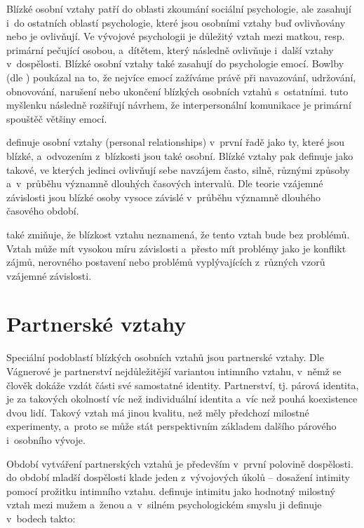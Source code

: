 \documentclass[a4paper, 12pt, notitlepage, oneside, numbers=noenddot]{report}
\begin{document}
Blízké osobní vztahy patří do oblasti zkoumání sociální psychologie,
ale zasahují i~do ostatních oblastí psychologie, které jsou osobními
vztahy buď ovlivňovány nebo je ovlivňují.  Ve vývojové psychologii je
důležitý vztah mezi matkou, resp. primární pečující osobou, a~dítětem,
který následně ovlivňuje i~další vztahy v~dospělosti.  Blízké osobní
vztahy také zasahují do psychologie emocí.  Bowlby (dle
\citealp{GuerreroAndersen2000}) poukázal na to, že nejvíce emocí
zažíváme právě při navazování, udržování, obnovování, narušení nebo
ukončení blízkých osobních vztahů s~ostatními.
\citet{GuerreroAndersen2000} tuto myšlenku následně rozšiřují návrhem,
že interpersonální komunikace je primární spouštěč většiny emocí.

\citet{Kelley1986} definuje osobní vztahy (personal relationships)
v~první řadě jako ty, které jsou blízké, a~odvozením z~blízkosti jsou
také osobní.  Blízké vztahy pak definuje jako takové, ve kterých
jedinci ovlivňují sebe navzájem často, silně, různými způsoby
a~v~průběhu významně dlouhých časových intervalů.  Dle teorie vzájemné
závislosti jsou blízké osoby vysoce závislé v~průběhu významně
dlouhého časového období.

\citeauthor{Kelley1986} také zmiňuje, že blízkost vztahu neznamená, že
tento vztah bude bez problémů.  Vztah může mít vysokou míru závislosti
a~přesto mít problémy jako je konflikt zájmů, nerovného postavení nebo
problémů vyplývajících z~různých vzorů vzájemné závislosti.

\section{Partnerské vztahy}
Speciální podoblastí blízkých osobních vztahů jsou partnerské vztahy.
Dle Vágnerové \citeyearpar{Vagnerova2007} je partnerství
nejdůležitější variantou intimního vztahu, v~němž se člověk dokáže
vzdát části své samostatné identity.  Partnerství, tj. párová
identita, je za takových okolností víc než individuální identita a~víc
než pouhá koexistence dvou lidí.  Takový vztah má jinou kvalitu, než
měly předchozí milostné experimenty, a~proto se může stát
perspektivním základem dalšího párového i~osobního vývoje.

Období vytváření partnerských vztahů je především v~první polovině
dospělosti.  \citet{Erikson1999} do období mladší dospělosti klade
jeden z~vývojových úkolů -- dosažení intimity pomocí prožitku
intimního vztahu.  \citet{Rican2006} definuje intimitu jako hodnotný
milostný vztah mezi mužem a~ženou a~v~silném psychologickém smyslu ji
definuje v~bodech takto:
\end{document}
